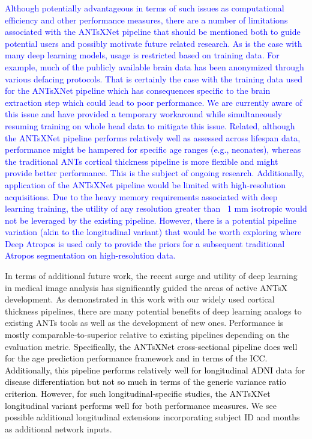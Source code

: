 \documentclass[12pt,]{article}
\begin{document}
\textcolor{blue}{
Although potentially advantageous in terms of such issues as computational
efficiency and other performance measures, there are a number of limitations
associated with the ANTsXNet pipeline that should be mentioned both to guide
potential users and possibly motivate future related research.  As is the
case with many deep learning models, usage is restricted based on training
data.  For example, much of the publicly available brain data has been
anonymized through various defacing protocols.  That is certainly the case
with the training data used for the ANTsXNet pipeline which has consequences
specific to the brain extraction step which could lead to poor performance.
We are currently aware of this issue and have provided a temporary workaround
while simultaneously resuming training on whole head data to mitigate this issue.
Related, although the ANTsXNet pipeline performs relatively well as assessed
across lifespan data, performance might be hampered for specific age ranges
(e.g., neonates), whereas the traditional ANTs cortical thickness pipeline
is more flexible and might provide better performance.  This is the subject
of ongoing research.  Additionally, application of the ANTsXNet pipeline would
be limited with high-resolution acquisitions.  Due to the heavy memory
requirements associated with deep learning training, the utility of any
resolution greater than ~1 mm isotropic would not be leveraged by the
existing pipeline.  However, there is a potential pipeline variation (akin
to the longitudinal variant) that would be worth exploring where Deep Atropos
is used only to provide the priors for a subsequent traditional Atropos
segmentation on high-resolution data.}

In terms of additional future work, the recent surge and utility of deep
learning in medical image analysis has significantly guided the areas of
active ANTsX development. As demonstrated in this work with our widely
used cortical thickness pipelines, there are many potential benefits of
deep learning analogs to existing ANTs tools as well as the development
of new ones. Performance is \textcolor{black}{mostly}
comparable-to-superior relative to existing pipelines depending on the
evaluation metric. \textcolor{black}{Specifically, the ANTsXNet
cross-sectional pipeline does well for the age prediction performance framework
and in terms of the ICC.  Additionally, this pipeline performs relatively well
for longitudinal ADNI data for disease differentiation but not so much in terms
of the generic variance ratio criterion.  However, for such longitudinal-specific
studies, the ANTsXNet longitudinal variant performs well for both performance
measures.} We see possible additional longitudinal extensions
incorporating subject ID and months as additional network inputs.
\end{document}
